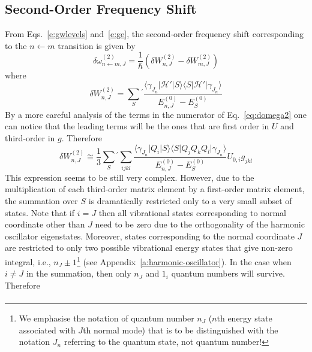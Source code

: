 \documentclass[a4paper,titlepage,twoside,fleqn,12pt]{book}
\begin{document}
\begin{refsection}
\subsection{Second-Order Frequency Shift}

From Eqs.~\eqref{e:gwlevels} and~\eqref{e:ge}, the second\hyp{}order 
frequency shift corresponding to the $n\leftarrow m$ transition 
is given by
%
\begin{equation}\label{e:dw-second-order-pt}
\delta \omega_{n\leftarrow m,J}^{(2)} = 
\frac{1}{\hbar} 
\left( \delta W_{n,J}^{(2)} - \delta W_{m,J}^{(2)} \right)
\end{equation}
%
where
%
\begin{equation}\label{eq:domega2}
\delta W_{n,J}^{(2)} = \sum_{S}{^{'}}
\frac{
   \langle \gamma_{J_n} \vert \mathscr{H}' \vert S            \rangle
   \langle S            \vert \mathscr{H}' \vert \gamma_{J_n} \rangle
}{E^{(0)}_{n,J} - E^{(0)}_S}
\end{equation}
%
By a more careful analysis of the terms in the numerator of
Eq.~\eqref{eq:domega2} one can notice that the leading terms
will be the ones that are first order in $U$ and third-order 
in $g$. Therefore 
%
\begin{equation}\label{eq:domega2approx}
\delta W_{n,J}^{(2)} \cong 
\frac{1}{3}
\sum_{S}{^{'}}
\sum_{ijkl}
\frac{
   \langle \gamma_{J_n} \vert Q_i \vert S                   \rangle
   \langle S            \vert Q_jQ_kQ_l \vert \gamma_{J_n}  \rangle
}{E^{(0)}_{n,J} - E^{(0)}_S} U_{0,i} g_{jkl}
\end{equation}
%
This expression seems to be still very complex. However, due to the multiplication of each 
third-order matrix element by a first-order matrix element, the summation
over $S$ is dramatically restricted only to a very small subset of states.
Note that if $i=J$ then all vibrational states corresponding to normal coordinate
other than $J$ need to be zero due to the orthogonality of the harmonic oscillator
eigenstates. Moreover, states corresponding to the normal coordinate $J$ are restricted 
to only two possible
vibrational energy states that give non\hyp{}zero integral, i.e., $n_J \pm 1$\footnote{
We emphasise the notation of quantum number $n_J$ ($n$th energy state associated with 
$J$th normal mode) that is to be distinguished with
the notation $J_n$ referring to the quantum state, not quantum number!} 
(see Appendix~\ref{a:harmonic-oscillator}).
In the case when $i\ne J$ in the summation, then only $n_J$ and $1_i$ quantum numbers will 
survive. Therefore
%
\begin{multline}  \label{eq:1x3}

\end{multline}
\end{refsection}
\end{document}
